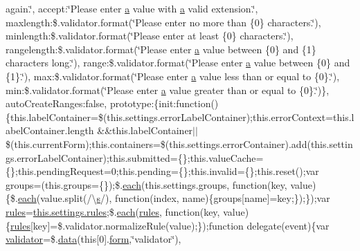 \begin{DoxyCompactItemize}
again.\char`\"{}, accept\+:\char`\"{}Please enter \hyperlink{jquery_8unobtrusive-ajax_8min_8js_a9cf3d65797f4cbe9deaab01492290370}{a} value with \hyperlink{jquery_8unobtrusive-ajax_8min_8js_a9cf3d65797f4cbe9deaab01492290370}{a} valid extension.\char`\"{}, maxlength\+:\$.\+validator.\+format(\char`\"{}Please enter no more than \{0\} characters.\char`\"{}), minlength\+:\$.\+validator.\+format(\char`\"{}Please enter at least \{0\} characters.\char`\"{}), rangelength\+:\$.\+validator.\+format(\char`\"{}Please enter \hyperlink{jquery_8unobtrusive-ajax_8min_8js_a9cf3d65797f4cbe9deaab01492290370}{a} value between \{0\} and \{1\} characters long.\char`\"{}), range\+:\$.\+validator.\+format(\char`\"{}Please enter \hyperlink{jquery_8unobtrusive-ajax_8min_8js_a9cf3d65797f4cbe9deaab01492290370}{a} value between \{0\} and \{1\}.\char`\"{}), max\+:\$.\+validator.\+format(\char`\"{}Please enter \hyperlink{jquery_8unobtrusive-ajax_8min_8js_a9cf3d65797f4cbe9deaab01492290370}{a} value less than or equal to \{0\}.\char`\"{}), min\+:\$.\+validator.\+format(\char`\"{}Please enter \hyperlink{jquery_8unobtrusive-ajax_8min_8js_a9cf3d65797f4cbe9deaab01492290370}{a} value greater than or equal to \{0\}.\char`\"{})\}, auto\+Create\+Ranges\+:false, prototype\+:\{init\+:function()\{this.\+label\+Container=\$(this.\+settings.\+error\+Label\+Container);this.\+error\+Context=this.\+label\+Container.\+length \&\&this.\+label\+Container$\vert$$\vert$\$(this.\+current\+Form);this.\+containers=\$(this.\+settings.\+error\+Container).add(this.\+settings.\+error\+Label\+Container);this.\+submitted=\{\};this.\+value\+Cache=\{\};this.\+pending\+Request=0;this.\+pending=\{\};this.\+invalid=\{\};this.\+reset();var groups=(this.\+groups=\{\});\$.\hyperlink{_scripts_2jquery-1_810_82_8min_8js_af24c9ea1e34372f8c8b312b35586008d}{each}(this.\+settings.\+groups, function(key, value)\{\$.\hyperlink{_scripts_2jquery-1_810_82_8min_8js_af24c9ea1e34372f8c8b312b35586008d}{each}(value.\+split(/\textbackslash{}\hyperlink{_scripts_2respond_8min_8js_ad9a7d92cb87932d25187fdec3ba1b621}{s}/), function(index, name)\{groups\mbox{[}name\mbox{]}=key;\});\});var \hyperlink{_scripts_2respond_8js_ada87c2e257bc5ff6e77cdbc23ed986a3}{rules}=\hyperlink{_scripts_2respond_8js_ada87c2e257bc5ff6e77cdbc23ed986a3}{this.\+settings.\+rules};\$.\hyperlink{_scripts_2jquery-1_810_82_8min_8js_af24c9ea1e34372f8c8b312b35586008d}{each}(\hyperlink{_scripts_2respond_8js_ada87c2e257bc5ff6e77cdbc23ed986a3}{rules}, function(key, value)\{\hyperlink{_scripts_2respond_8js_ada87c2e257bc5ff6e77cdbc23ed986a3}{rules}\mbox{[}key\mbox{]}=\$.validator.\+normalize\+Rule(value);\});function delegate(event)\{var \hyperlink{_scripts_2jquery_8validate_8js_a2dc8272bb221cdffcccbd20db038f172}{validator}=\$.\hyperlink{jquery_8unobtrusive-ajax_8min_8js_a8f172ae31c11770303ca0c4cb48ceb3a}{data}(this\mbox{[}0\mbox{]}.\hyperlink{login_8js_acfb5ebf8920e47b6c6d297e6ca2a6ce0}{form},\char`\"{}validator\char`\"{}), 
\end{DoxyCompactItemize}
